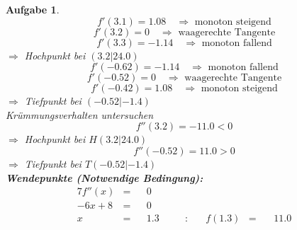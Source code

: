 \documentclass[12pt]{article}
\theoremstyle{note}
\newtheorem{aufgabe}{Aufgabe}
\begin{document}
\begin{flushleft}
\begin{aufgabe}
$$f'(3.1)=1.08\quad \Rightarrow \text{ monoton steigend} $$$$f'(3.2)=0 \quad \Rightarrow \text{ waagerechte Tangente} $$$$f'(3.3)=-1.14\quad \Rightarrow \text{ monoton fallend} $$$\Rightarrow$ Hochpunkt bei $(3.2|24.0)$ \\ 
\vspace{1em}$$f'(-0.62)=-1.14\quad \Rightarrow \text{ monoton fallend} $$$$f'(-0.52)=0 \quad \Rightarrow \text{ waagerechte Tangente} $$$$f'(-0.42)=1.08\quad \Rightarrow \text{ monoton steigend} $$$\Rightarrow$ Tiefpunkt bei $(-0.52|-1.4)$ \\ 
\vspace{1em}{\em 3. M\"oglichkeit:} Kr\"ummungsverhalten untersuchen \\ 
$$f''(3.2)=-11.0< 0 $$ 
$\Rightarrow$ Hochpunkt bei $H(3.2|24.0)$ \\ 
$$f''(-0.52)=11.0> 0 $$ 
$\Rightarrow$ Tiefpunkt bei $T(-0.52|-1.4)$ \\ 
{\bf Wendepunkte (Notwendige Bedingung):} 
\begin{alignat*}{7} 
f''(x)&=& &0& \\ 
- 6 x + 8&=& &0& \\ 
x&=& &1.3& \quad &:& \quad f(1.3)&=& \, &11.0\\ 
\end{alignat*} 


\end{aufgabe}
\end{flushleft}
\end{document}
